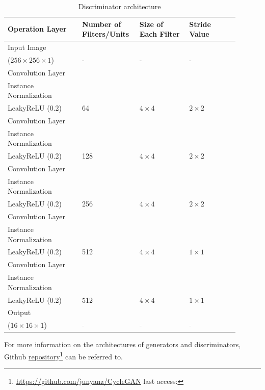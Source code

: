 \begin{table}[H]
    \centering

    \begin{tabular}{P{0.30\linewidth} P{0.20\linewidth} P{0.20\linewidth} P{0.20\linewidth}} 
        \toprule
        \textbf{Operation Layer} & \textbf{Number of Filters/Units}  & \textbf{Size of Each Filter} & \textbf{Stride Value}\\
        \toprule
        \toprule
        Input Image \\($256 \times 256 \times 1$) & - & - & -\\
        \midrule
        Convolution Layer\\Instance Normalization\\LeakyReLU (0.2) & 64 & $4 \times 4$ & $2 \times 2$\\
        \midrule
        Convolution Layer\\Instance Normalization\\LeakyReLU (0.2) & 128 & $4 \times 4$ & $2 \times 2$\\
        \midrule
        Convolution Layer\\Instance Normalization\\LeakyReLU (0.2) & 256 & $4 \times 4$ & $2 \times 2$\\
        \midrule
        Convolution Layer\\Instance Normalization\\LeakyReLU (0.2) & 512 & $4 \times 4$ & $1 \times 1$\\
        \midrule
        Convolution Layer\\Instance Normalization\\LeakyReLU (0.2) & 512 & $4 \times 4$ & $1 \times 1$\\
        \midrule
        \midrule
        Output  \\($16 \times 16 \times 1$) & - & - & -\\
        \bottomrule
    \end{tabular}
    \caption[Discriminator architecture]{Discriminator architecture}
    \label{table:DiscriminatorArchitecture}
\end{table}

For more information on the architectures of generators and discriminators, Github \href{https://github.com/junyanz/CycleGAN}{repository}\footnote{\url{https://github.com/junyanz/CycleGAN} last access: \dcdate} can be referred to. 



